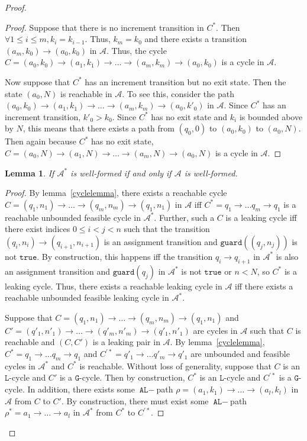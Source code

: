 \documentclass[12pt]{article}
\newtheorem{lemma}[thm]{Lemma}
\theoremstyle{definition}
\begin{document}
\begin{proof}
\begin{proof}
	Suppose that there is no increment transition in $C^*$. Then $\forall 1\leq i \leq m, k_i = k_{i-1}$. Thus, $k_m = k_0$ and there exists a transition $(a_m, k_0)\to (a_0, k_0)$ in $\mathcal{A}$. Thus, the cycle $C = (a_0, k_0)\to (a_1, k_1)\to \ldots\to (a_m, k_m) \to (a_0, k_0)$ is a cycle in $\mathcal{A}$.

	Now suppose that $C^*$ has an increment transition but no exit state. Then the state $(a_0, N)$ is reachable in $\mathcal{A}$. To see this, consider the path $(a_0, k_0)\to (a_1, k_1)\to \ldots\to (a_m, k_m) \to (a_0, k'_0)$ in $\mathcal{A}$. Since $C^*$ has an increment transition, $k'_0 > k_0$. 
	Since $C^*$ has no exit state and $k_i$ is bounded above by $N$, this means that there exists a path from $(q_0, 0)$ to $(a_0, k_0)$ to $(a_0, N)$. Then again because $C^*$ has no exit state, $C = (a_0, N)\to (a_1, N)\to \ldots\to (a_m, N) \to (a_0, N)$ is a cycle in $\mathcal{A}$.
\end{proof}

\begin{lemma}\label{wellformedequiv}
	If $\mathcal{A}^*$ is well-formed if and only if $\mathcal{A}$ is well-formed.	
\end{lemma}
\begin{proof}

	By lemma~\ref{cyclelemma}, there exists a reachable cycle $C = (q_1, n_1)\to\ldots \to (q_m, n_m) \to (q_1, n_1)$ in $\mathcal{A}$ iff $C^* = q_1\to\ldots q_m\to q_1$ is a reachable unbounded feasible cycle in $\mathcal{A}^*$. Further, such a $C$ is a leaking cycle iff there exist indices $0\leq i < j < n$ such that the transition $(q_i, n_i)\to (q_{i+1}, n_{i+1})$ is an assignment transition and $\texttt{guard}((q_j, n_j))$ is not $\texttt{true}$. 
	By construction, this happens iff the transition $q_i\to q_{i+1}$ in $\mathcal{A}^*$ is also an assignment transition and $\texttt{guard}(q_j)$ in $\mathcal{A}^*$ is not $\texttt{true}$ or $n < N$, so $C^*$ is a leaking cycle. Thus, there exists a reachable leaking cycle in $\mathcal{A}$ iff there exists a reachable unbounded feasible leaking cycle in $\mathcal{A}^*$.

	Suppose that $C = (q_1, n_1)\to\ldots \to (q_m, n_m) \to (q_1, n_1)$ and $C' = (q'_1, n'_1)\to\ldots \to (q'_m, n'_m) \to (q'_1, n'_1)$ are cycles in $\mathcal{A}$ such that $C$ is reachable and $(C, C')$ is a leaking pair in $\mathcal{A}$. By lemma~\ref{cyclelemma}, $C^* = q_1\to\ldots q_m\to q_1$ and $C^{\prime *} = q'_1 \to \ldots q'_m \to q'_1$ are unbounded and feasible cycles in $\mathcal{A}^*$ and $C^*$ is reachable.
	Without loss of generality, suppose that $C$ is an $\texttt{L}$-cycle and $C'$ is a $\texttt{G}$-cycle. Then by construction, $C^*$ is an $\texttt{L}$-cycle and $C^{\prime *}$ is a $\texttt{G}$-cycle. In addition, there exists some $\texttt{AL}-$path $\rho = (a_1, k_1)\to\ldots \to (a_l, k_l)$ in $\mathcal{A}$ from $C$ to $C'$. By construction, there must exist some $\texttt{AL}-$path $\rho^* = a_1\to\ldots\to a_l$ in $\mathcal{A}^*$ from $C^*$ to $C^{\prime *}$. 


\end{proof}
\end{proof}
\end{document}

